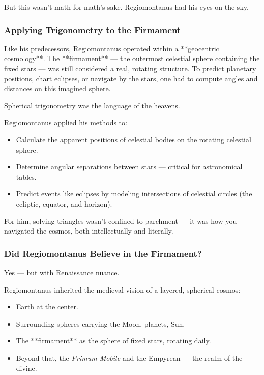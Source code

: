 But this wasn’t math for math’s sake. Regiomontanus had his eyes on the sky.

\subsubsection*{Applying Trigonometry to the Firmament}

Like his predecessors, Regiomontanus operated within a **geocentric cosmology**. The **firmament** — the outermost celestial sphere containing the fixed stars — was still considered a real, rotating structure. To predict planetary positions, chart eclipses, or navigate by the stars, one had to compute angles and distances on this imagined sphere.

Spherical trigonometry was the language of the heavens.

Regiomontanus applied his methods to:

\begin{itemize}
  \item Calculate the apparent positions of celestial bodies on the rotating celestial sphere.
  \item Determine angular separations between stars — critical for astronomical tables.
  \item Predict events like eclipses by modeling intersections of celestial circles (the ecliptic, equator, and horizon).
\end{itemize}

For him, solving triangles wasn’t confined to parchment — it was how you navigated the cosmos, both intellectually and literally.

\subsubsection*{Did Regiomontanus Believe in the Firmament?}

Yes — but with Renaissance nuance.

Regiomontanus inherited the medieval vision of a layered, spherical cosmos:

\begin{itemize}
  \item Earth at the center.
  \item Surrounding spheres carrying the Moon, planets, Sun.
  \item The **firmament** as the sphere of fixed stars, rotating daily.
  \item Beyond that, the \textit{Primum Mobile} and the Empyrean — the realm of the divine.
\end{itemize}

